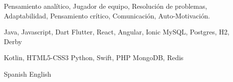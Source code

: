 
\begin{cvparagraph}
Pensamiento analítico, Jugador de equipo, Resolución de problemas, Adaptabilidad, Pensamiento crítico, Comunicación, Auto-Motivación.
\end{cvparagraph}

\begin{multicols}{3}
  \begin{cvskills}
    \cvskill
      {Java, Javascript, Dart} %
      {\faStar\faStar\faStar\faStar\faStarHalfEmpty} %
    \cvskill
      {Flutter, React, Angular, Ionic} %
      {\faStar\faStar\faStar\faStar\faStarHalfEmpty} %
    \cvskill
      {MySQL, Postgres, H2, Derby} %
      {\faStar\faStar\faStar\faStar\faStarHalfEmpty} %
  \end{cvskills}

  \columnbreak

  \begin{cvskills}
    \cvskill
      {Kotlin, HTML5-CSS3} %
      {\faStar\faStar\faStar\faStarHalfEmpty\faStarO} %
    \cvskill
      {{\hphantom{Empty}} Python, Swift, PHP} %
      {\faStar\faStar\faStar\faStarHalfEmpty\faStarO} %
    \cvskill
      {MongoDB, Redis} %
      {\faStar\faStar\faStar\faStarHalfEmpty\faStarO} %
  \end{cvskills}

  \columnbreak

  \begin{cvskills}
    \cvskill
      {Spanish} %
      {\faStar\faStar\faStar\faStar\faStar} %
    \cvskill
      {English} %
      {\faStar\faStar\faStar\faStarHalfEmpty\faStarO} %
  \end{cvskills}
\end{multicols}
